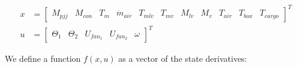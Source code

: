 \begin{equation}  \label{eq:xu}
	\begin{split}
		x &= \begin{bmatrix}
			M_{pjj}				&		%
			M_{con} 			&		%
			T_m 				&		%
			\dot{m}_{air}		&		%
			T_{mlv}				&		%
			T_{mv}				&		%
			M_{lv}				&		%
			M_v					&		%
			T_{air}				&		%
			T_{box}				&		%
			T_{cargo}					%
		\end{bmatrix}^T \\
		u &= \begin{bmatrix}
			\Theta_1			&			%
			\Theta_2 			&			%
			U_{fan_1}			&			%
			U_{fan_2}			&			%
			\omega							%
		\end{bmatrix}^T
	\end{split}
\end{equation}


We define a function $f(x,u)$ as a vector of the state derivatives:

